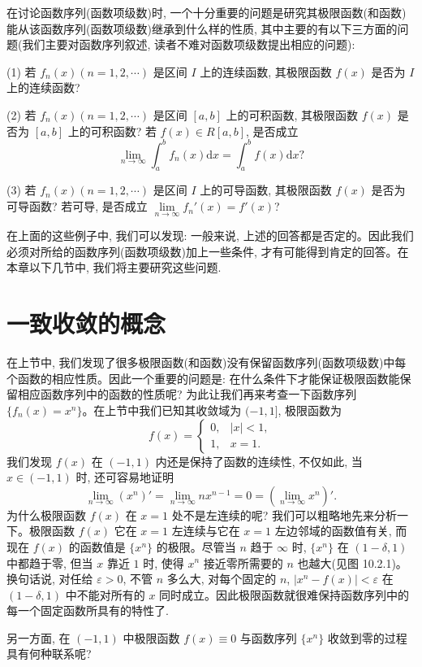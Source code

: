 在讨论函数序列(函数项级数)时, 一个十分重要的问题是研究其极限函数(和函数)能从该函数序列(函数项级数)继承到什么样的性质, 其中主要的有以下三方面的问题(我们主要对函数序列叙述, 读者不难对函数项级数提出相应的问题):

(1) 若 $f_n(x)(n=1,2,\cdots)$ 是区间 $I$ 上的连续函数, 其极限函数 $f(x)$ 是否为 $I$ 上的连续函数?

(2) 若 $f_n(x)(n=1,2,\cdots)$ 是区间 $[a,b]$ 上的可积函数, 其极限函数 $f(x)$ 是否为 $[a,b]$ 上的可积函数? 若 $f(x)\in R[a,b]$, 是否成立
\[
  \lim_{n\to\infty}\int_a^b f_n(x)\mathrm dx=\int_a^b f(x)\mathrm dx?
\]

(3) 若 $f_n(x)(n=1,2,\cdots)$ 是区间 $I$ 上的可导函数, 其极限函数 $f(x)$ 是否为可导函数? 若可导, 是否成立 $\lim\limits_{n\to\infty}f_n'(x)=f'(x)$?

在上面的这些例子中, 我们可以发现: 一般来说, 上述的回答都是否定的。因此我们必须对所给的函数序列(函数项级数)加上一些条件, 才有可能得到肯定的回答。在本章以下几节中, 我们将主要研究这些问题.

\section{一致收敛的概念}
\label{sec:ma-10-2}

在上节中, 我们发现了很多极限函数(和函数)没有保留函数序列(函数项级数)中每个函数的相应性质。因此一个重要的问题是: 在什么条件下才能保证极限函数能保留相应函数序列中的函数的性质呢? 为此让我们再来考查一下函数序列 $\{f_n(x)=x^n\}$。在上节中我们已知其收敛域为 $(-1,1]$, 极限函数为
\[
  f(x)=
  \begin{cases}
    0, & |x|<1,\\
    1, & x=1.
  \end{cases}
\]
我们发现 $f(x)$ 在 $(-1,1)$ 内还是保持了函数的连续性, 不仅如此, 当 $x\in(-1,1)$ 时, 还可容易地证明
\[
  \lim_{n\to\infty}(x^n)'=\lim_{n\to\infty}nx^{n-1}=0=\left(\lim_{n\to\infty}x^n\right)'.
\]
为什么极限函数 $f(x)$ 在 $x=1$ 处不是左连续的呢? 我们可以粗略地先来分析一下。极限函数 $f(x)$ 它在 $x=1$ 左连续与它在 $x=1$ 左边邻域的函数值有关, 而现在 $f(x)$ 的函数值是 $\{x^n\}$ 的极限。尽管当 $n$ 趋于 $\infty$ 时, $\{x^n\}$ 在 $(1-\delta,1)$ 中都趋于零, 但当 $x$ 靠近 $1$ 时, 使得 $x^n$ 接近零所需要的 $n$ 也越大(见图 10.2.1)。换句话说, 对任给 $\varepsilon>0$, 不管 $n$ 多么大, 对每个固定的 $n$, $|x^n-f(x)|<\varepsilon$ 在 $(1-\delta,1)$ 中不能对所有的 $x$ 同时成立。因此极限函数就很难保持函数序列中的每一个固定函数所具有的特性了.

另一方面, 在 $(-1,1)$ 中极限函数 $f(x)\equiv0$ 与函数序列 $\{x^n\}$ 收敛到零的过程具有何种联系呢?

